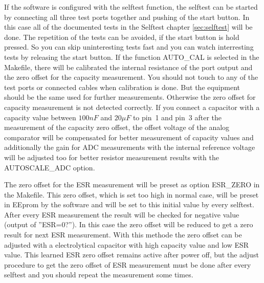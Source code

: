 If the software is configured with the selftest function, the selftest can be started by connecting all three test ports together
and pushing of the start button.
In this case all of the documented tests in the Selftest chapter \ref{sec:selftest} will be done.
The repetition of the tests can be avoided, if the start button is hold pressed.
So you can skip uninteresting tests fast and you can watch interresting tests by releasing the start button.
If the function AUTO\_CAL is selected in the Makefile, there will be calibrated 
the internal resistance of the port output and 
the zero offset for the capacity measurement.
You should not touch to any of the test ports or connected cables when calibration is done.
But the equipment should be the same used for further measurements. Otherwise the zero offset for
capacity measurement is not detected correctly.
If you connect a capacitor with a capacity value between \(100 nF\) and \(20 \mu F\) to pin~1 and pin~3 after the measurement of the capacity zero offset, 
the offset voltage of the analog comparator will be compensated for better measurement of capacity values and 
additionally the gain for ADC measurements with the internal reference voltage will be adjusted too 
for better resistor measurement results with the AUTOSCALE\_ADC option.


The zero offset for the ESR measurement will be preset as option ESR\_ZERO in the Makefile.
This zero offset, which is set too high in normal case, will be preset in EEprom by the software and will be
set to this initial value by every selftest.
After every ESR measurement the result will be checked for negative value (output of ''ESR=0?''). In this case the zero offset will
be reduced to get a zero result for next ESR measurement.
With this methode the zero offset can be adjusted with a electrolytical capacitor with high capacity value and
low ESR value.
This learned ESR zero offset remains active after power off, but the adjust procedure to get the zero offset of ESR measurement
must be done after every selftest and you should repeat the measurement some times.
